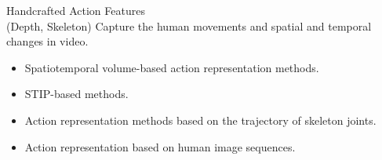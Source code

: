 \begin{frame}{Handcrafted Action Features \\ (Depth, Skeleton)}
    Capture the human movements and spatial and temporal changes in video.
    \begin{itemize}
        \item Spatiotemporal volume-based action representation methods.

        \item STIP-based methods.
        \item Action representation methods based on the trajectory of skeleton joints.
        \item Action representation based on human image sequences.
    \end{itemize}
\end{frame}



